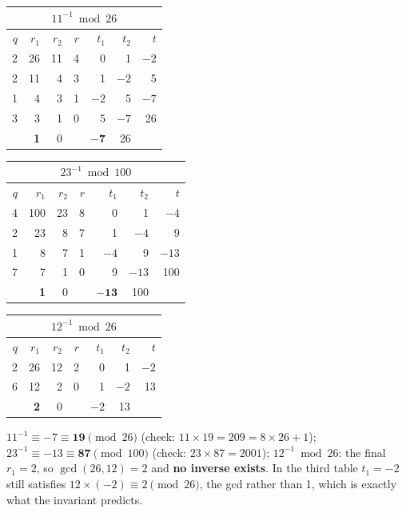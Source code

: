 \begin{center}\small
\begin{tabular}{@{}r|rrr|rrr@{}}
\multicolumn{7}{c}{$11^{-1} \bmod 26$}\\
\toprule
$q$ & $r_1$ & $r_2$ & $r$ & $t_1$ & $t_2$ & $t$\\
\midrule
2 & 26 & 11 & 4 & 0 & 1 & $-2$\\
2 & 11 & 4 & 3 & 1 & $-2$ & 5\\
1 & 4 & 3 & 1 & $-2$ & 5 & $-7$\\
3 & 3 & 1 & 0 & 5 & $-7$ & 26\\
 & \textbf{1} & 0 & & $\mathbf{-7}$ & 26 & \\
\bottomrule
\end{tabular}
\quad
\begin{tabular}{@{}r|rrr|rrr@{}}
\multicolumn{7}{c}{$23^{-1} \bmod 100$}\\
\toprule
$q$ & $r_1$ & $r_2$ & $r$ & $t_1$ & $t_2$ & $t$\\
\midrule
4 & 100 & 23 & 8 & 0 & 1 & $-4$\\
2 & 23 & 8 & 7 & 1 & $-4$ & 9\\
1 & 8 & 7 & 1 & $-4$ & 9 & $-13$\\
7 & 7 & 1 & 0 & 9 & $-13$ & 100\\
 & \textbf{1} & 0 & & $\mathbf{-13}$ & 100 & \\
\bottomrule
\end{tabular}
\quad
\begin{tabular}{@{}r|rrr|rrr@{}}
\multicolumn{7}{c}{$12^{-1} \bmod 26$}\\
\toprule
$q$ & $r_1$ & $r_2$ & $r$ & $t_1$ & $t_2$ & $t$\\
\midrule
2 & 26 & 12 & 2 & 0 & 1 & $-2$\\
6 & 12 & 2 & 0 & 1 & $-2$ & 13\\
 & \textbf{2} & 0 & & $-2$ & 13 & \\
\bottomrule
\end{tabular}
\end{center}
$11^{-1} \equiv -7 \equiv \mathbf{19} \pmod{26}$ (check: $11 \times 19 = 209 = 8 \times 26 + 1$); \;$23^{-1} \equiv -13 \equiv \mathbf{87} \pmod{100}$ (check: $23 \times 87 = 2001$); \;$12^{-1} \bmod 26$: the final $r_1 = 2$, so $\gcd(26, 12) = 2$ and \textbf{no inverse exists}. In the third table $t_1 = -2$ still satisfies $12 \times (-2) \equiv 2 \pmod{26}$, the gcd rather than 1, which is exactly what the invariant predicts.

